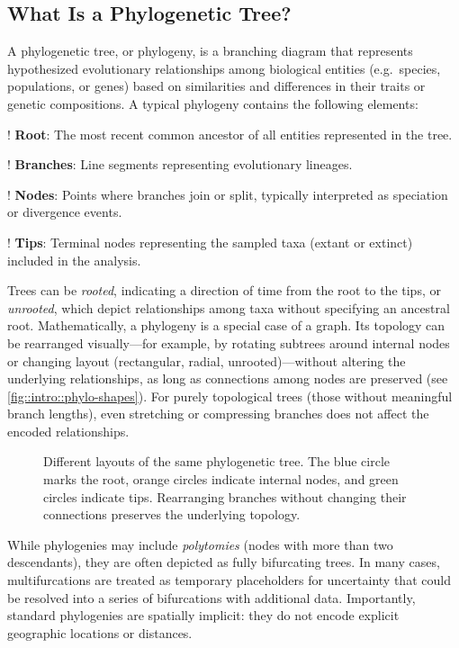 \subsection{What Is a Phylogenetic Tree?}

A phylogenetic tree, or phylogeny, is a branching diagram that represents hypothesized evolutionary relationships among biological entities (e.g.\ species, populations, or genes) based on similarities and differences in their traits or genetic compositions. A typical phylogeny contains the following elements:
\begin{fancyenumerate}
    \item! \textbf{Root}: The most recent common ancestor of all entities represented in the tree.
    \item! \textbf{Branches}: Line segments representing evolutionary lineages.
    \item! \textbf{Nodes}: Points where branches join or split, typically interpreted as speciation or divergence events.
    \item! \textbf{Tips}: Terminal nodes representing the sampled taxa (extant or extinct) included in the analysis.
\end{fancyenumerate}

Trees can be \emph{rooted}, indicating a direction of time from the root to the tips, or \emph{unrooted}, which depict relationships among taxa without specifying an ancestral root. Mathematically, a phylogeny is a special case of a graph. Its topology can be rearranged visually---for example, by rotating subtrees around internal nodes or changing layout (rectangular, radial, unrooted)---without altering the underlying relationships, as long as connections among nodes are preserved (see \autoref{fig::intro::phylo-shapes}). For purely topological trees (those without meaningful branch lengths), even stretching or compressing branches does not affect the encoded relationships.

\begin{figure}[ht]
    \centering
    \resizebox{0.5\textwidth}{!}{
        
    }
    \caption{Different layouts of the same phylogenetic tree. The blue circle marks the root, orange circles indicate internal nodes, and green circles indicate tips. Rearranging branches without changing their connections preserves the underlying topology.}
    \label{fig::intro::phylo-shapes}
\end{figure}

While phylogenies may include \emph{polytomies} (nodes with more than two descendants), they are often depicted as fully bifurcating trees. In many cases, multifurcations are treated as temporary placeholders for uncertainty that could be resolved into a series of bifurcations with additional data. Importantly, standard phylogenies are spatially implicit: they do not encode explicit geographic locations or distances.

